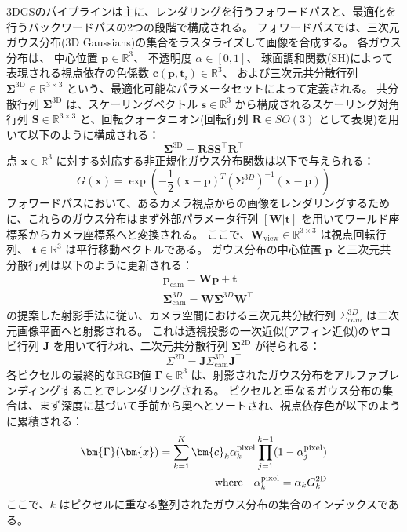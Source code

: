 3DGSのパイプラインは主に、レンダリングを行うフォワードパスと、最適化を行うバックワードパスの2つの段階で構成される。
フォワードパスでは、三次元ガウス分布(3D Gaussians)の集合をラスタライズして画像を合成する。
各ガウス分布は、
中心位置 $\bm{p} \in \mathbb{R}^3$、
不透明度 $\alpha \in [0, 1]$、
球面調和関数(SH)によって表現される視点依存の色係数 $\bm{c}(\bm{p}, \bm{t}_i) \in \mathbb{R}^{3}$、
および三次元共分散行列 $\bm{\Sigma}^{\mathrm{3D}} \in \mathbb{R}^{3 \times 3}$ 
という、最適化可能なパラメータセットによって定義される。
共分散行列 $\bm{\Sigma}^{\mathrm{3D}}$ は、スケーリングベクトル $\bm{s} \in \mathbb{R}^3$ から構成されるスケーリング対角行列 $\bm{S} \in \mathbb{R}^{3 \times 3}$ と、回転クォータニオン(回転行列 $\bm{R} \in SO(3)$ として表現)を用いて以下のように構成される：
\begin{equation}\label{eq:3dgs-sigma_RssR}
  \bm{\Sigma}^{\mathrm{3D}} = \bm{R} \bm{S} \bm{S}^\top \bm{R}^\top
\end{equation}
点 $\bm{x} \in \mathbb{R}^3$ に対する対応する非正規化ガウス分布関数は以下で与えられる：
\begin{equation}\label{eq:3dgs-G(x)}
  G(\bm{x}) = 
    \exp \left( -\frac{1}{2} (\bm{x} - \bm{p})^T \left({\bm{\Sigma}^{3D}}\right)^{-1} (\bm{x} - \bm{p}) \right)
\end{equation}
フォワードパスにおいて、あるカメラ視点からの画像をレンダリングするために、これらのガウス分布はまず外部パラメータ行列 $[\bm{W} | \bm{t}]$ を用いてワールド座標系からカメラ座標系へと変換される。
ここで、$\bm{W}_\mathrm{view} \in \mathbb{R}^{3 \times 3}$ は視点回転行列、
$\bm{t} \in \mathbb{R}^3$ は平行移動ベクトルである。
ガウス分布の中心位置 $\bm{p}$ と三次元共分散行列は以下のように更新される：
\begin{align*}
  &\bm{p}_\mathrm{cam} = \bm{W}\bm{p} + \bm{t} \\
  &\bm{\Sigma}^{3D}_\mathrm{cam} = \bm{W} \bm{\Sigma}^{3D} \bm{W}^\top
\end{align*} 
\cite{Zwicker2001_EWA-volume-splatting} の提案した射影手法に従い、カメラ空間における三次元共分散行列 $\Sigma_{cam}^{3D}$ は二次元画像平面へと射影される。
これは透視投影の一次近似(アフィン近似)のヤコビ行列 $\bm{J}$ を用いて行われ、二次元共分散行列 $\bm{\Sigma}^{\mathrm{2D}}$ が得られる：
\begin{equation}\label{eq:3dgs-affine-projection}
\Sigma^\mathrm{2D} = \bm{J} \Sigma^{\mathrm{3D}}_\mathrm{cam} \bm{J}^\top
\end{equation}
各ピクセルの最終的なRGB値 $\bm{\Gamma} \in \mathbb{R}^{3}$ は、射影されたガウス分布をアルファブレンディングすることでレンダリングされる。
ピクセルと重なるガウス分布の集合は、まず深度に基づいて手前から奥へとソートされ、視点依存色が以下のように累積される：
\begin{align}\label{eq:3dgs-alpha-blending}
  \bm{\Gamma}(\bm{x}) = \sum_{k=1}^{K} \bm{c}_k \alpha^{\text{pixel}}_k \prod_{j=1}^{k-1} (1-\alpha^{\text{pixel}}_j) \\
  \quad \text{where} \quad \alpha^{\text{pixel}}_k = \alpha_k G_k^{\mathrm{2D}} \notag
\end{align}
ここで、$k$ はピクセルに重なる整列されたガウス分布の集合のインデックスである。

